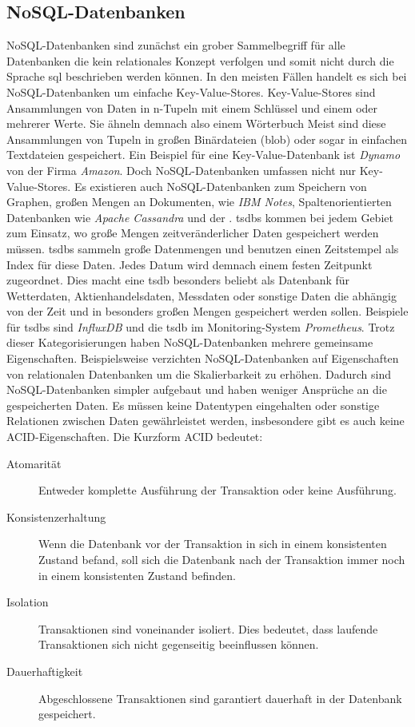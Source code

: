 \documentclass[titlepage]{report}
\begin{document}
\subsection*{NoSQL\hyp{}Datenbanken}
NoSQL\hyp{}Datenbanken sind zunächst ein grober Sammelbegriff für alle
Datenbanken die kein relationales Konzept verfolgen und somit nicht
durch die Sprache \gls{sql} beschrieben werden können. In den meisten
Fällen handelt es sich bei NoSQL\hyp{}Datenbanken um einfache
Key\hyp{}Value\hyp{}Stores. Key\hyp{}Value\hyp{}Stores sind Ansammlungen
von Daten in n\hyp{}Tupeln mit einem Schlüssel und einem oder mehrerer
Werte. Sie ähneln
demnach also einem Wörterbuch  Meist sind diese Ansammlungen von Tupeln
in großen Binärdateien (\gls{blob}) oder sogar in einfachen Textdateien
gespeichert. Ein Beispiel für eine Key\hyp{}Value\hyp{}Datenbank ist
\emph{Dynamo} von der Firma \emph{Amazon}. Doch NoSQL\hyp{}Datenbanken
umfassen nicht nur Key\hyp{}Value\hyp{}Stores. Es existieren auch
NoSQL\hyp{}Datenbanken zum Speichern von Graphen, großen Mengen an
Dokumenten, wie \emph{IBM Notes}, Spaltenorientierten Datenbanken wie
\emph{Apache Cassandra} und der . \glspl{tsdb} kommen bei
jedem Gebiet zum Einsatz, wo große Mengen zeitveränderlicher Daten
gespeichert werden müssen. \glspl{tsdb} sammeln große Datenmengen und
benutzen einen Zeitstempel als Index für diese Daten. Jedes Datum wird
demnach einem festen Zeitpunkt zugeordnet. Dies macht eine \gls{tsdb}
besonders beliebt als Datenbank für Wetterdaten,
Aktienhandelsdaten, Messdaten oder sonstige Daten die abhängig von der
Zeit und in besonders großen Mengen gespeichert werden sollen. Beispiele
für \glspl{tsdb} sind \emph{InfluxDB} und die \gls{tsdb} im
Monitoring-System \emph{Prometheus}. Trotz dieser Kategorisierungen
haben NoSQL\hyp{}Datenbanken mehrere gemeinsame Eigenschaften.
Beispielsweise verzichten NoSQL\hyp{}Datenbanken auf Eigenschaften von
relationalen Datenbanken um die Skalierbarkeit zu erhöhen\cite[S. 13]{TSDB}. Dadurch sind
NoSQL\hyp{}Datenbanken simpler aufgebaut und haben weniger Ansprüche an
die gespeicherten Daten. Es müssen keine Datentypen eingehalten oder
sonstige Relationen zwischen Daten gewährleistet werden, insbesondere
gibt es auch keine ACID\hyp{}Eigenschaften. Die Kurzform ACID 
bedeutet\cite{NOSQLKRAMER}\cite{SQLLEIPZIG}:
\begin{description}
    \item[Atomarität] Entweder komplette Ausführung der Transaktion oder
        keine Ausführung.
    \item[Konsistenzerhaltung] Wenn die Datenbank vor der Transaktion in
        sich in einem konsistenten Zustand befand, soll sich die
        Datenbank nach der Transaktion immer noch in einem konsistenten
        Zustand befinden.
    \item[Isolation] Transaktionen sind voneinander isoliert. Dies
        bedeutet, dass laufende Transaktionen sich nicht gegenseitig
        beeinflussen können.
    \item[Dauerhaftigkeit] Abgeschlossene Transaktionen sind garantiert
        dauerhaft in der Datenbank gespeichert.
\end{description}
\end{document}
